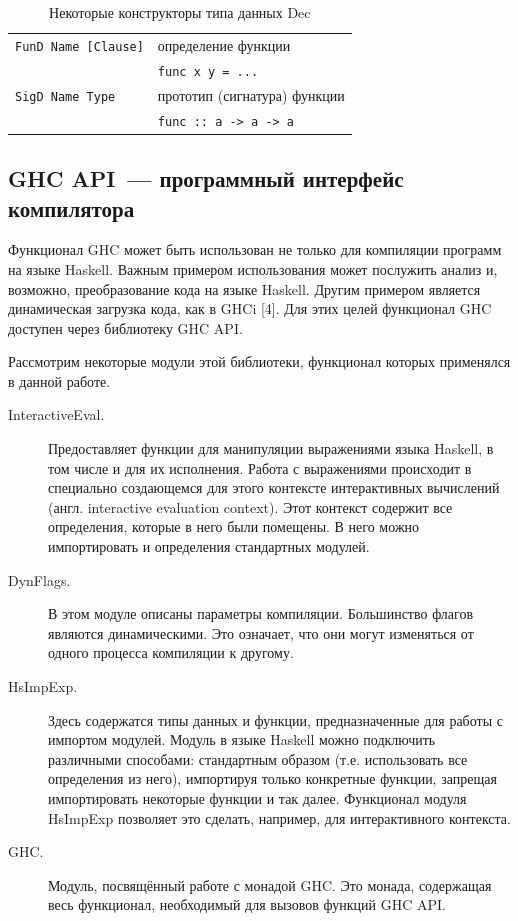 \begin{table}[h]
\begin{center}
	\begin{tabular}{ll}
		{\lstinline!FunD Name [Clause]!} & определение функции \\
										 & {\lstinline!func x y = ...!} \\
		{\lstinline!SigD Name Type!} & прототип (сигнатура) функции \\
									 & {\lstinline!func :: a -> a -> a!}
	\end{tabular}
\end{center}
\caption{Некоторые конструкторы типа данных Dec}
\label{decconstr}
\end{table}
	\subsection{GHC API~--- программный интерфейс компилятора}\label{ghcapisec} Функционал GHC может быть использован не только для компиляции программ на языке Haskell. Важным примером использования может послужить анализ и, возможно, преобразование кода на языке Haskell. Другим примером является динамическая загрузка кода, как	в GHCi [4]. Для этих целей функционал GHC доступен через библиотеку GHC API.
	
	Рассмотрим некоторые модули этой библиотеки, функционал которых применялся в данной работе.
	\begin{description}
		\item[InteractiveEval.] Предоставляет функции для манипуляции выражениями языка Haskell, в том числе и для их исполнения. Работа с выражениями происходит в специально создающемся для этого контексте интерактивных вычислений (англ. interactive evaluation context). Этот контекст содержит все определения, которые в него были помещены. В него можно импортировать и определения стандартных модулей.
		\item[DynFlags.] В этом модуле описаны параметры компиляции. Большинство флагов являются динамическими. Это означает, что они могут изменяться от одного процесса компиляции к другому.
		\item[HsImpExp.] Здесь содержатся типы данных и функции, предназначенные для работы с импортом модулей. Модуль в языке Haskell можно подключить различными способами: стандартным образом (т.е. использовать все определения из него), импортируя только конкретные функции, запрещая импортировать некоторые функции и так далее. Функционал модуля HsImpExp позволяет это сделать, например, для интерактивного контекста.
		\item[GHC.] Модуль, посвящённый работе с монадой GHC. Это монада, содержащая весь функционал, необходимый для вызовов функций GHC API. 
	\end{description} 

